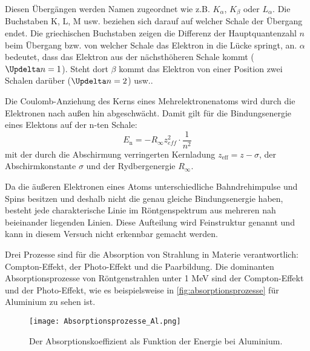 \documentclass[titlepage = firstcover]{scrartcl}
\begin{document}
        Diesen Übergängen werden Namen zugeordnet wie z.B. $K_\alpha$, $K_\beta$ oder $L_\alpha$. Die Buchstaben K, L, M usw. beziehen sich darauf auf welcher Schale der Übergang endet. Die griechischen Buchstaben zeigen die Differenz der Hauptquantenzahl $n$ beim Übergang bzw. von welcher Schale das Elektron in die Lücke springt, an. $\alpha$ bedeutet, dass das Elektron aus der nächsthöheren Schale kommt ($\Updelta n = 1$). Steht dort $\beta$ kommt das Elektron von einer Position zwei Schalen darüber ($\Updelta n = 2$) usw..

        Die Coulomb-Anziehung des Kerns eines Mehrelektronenatoms wird durch die Elektronen nach außen hin abgeschwächt. Damit gilt für die Bindungsenergie eines Elektons auf der n-ten Schale:
        \begin{equation}
            E_\text{n} = -R_{\infty} z^2_{eff} \cdot \frac{1}{n^2}
        \end{equation}
        mit der durch die Abschirmung verringerten Kernladung $z_\text{eff} = z - \sigma$, der Abschirmkonstante $\sigma$ und der Rydbergenergie $R_{\infty}$.

        Da die äußeren Elektronen eines Atoms unterschiedliche Bahndrehimpulse und Spins besitzen und deshalb nicht die genau gleiche Bindungsenergie haben, besteht jede charakterische Linie im Röntgenspektrum aus mehreren nah beieinander liegenden Linien. Diese Aufteilung wird Feinstruktur genannt und kann in diesem Versuch nicht erkennbar gemacht werden.

        Drei Prozesse sind für die Absorption von Strahlung in Materie verantwortlich: Compton-Effekt, der Photo-Effekt und die Paarbildung.
        Die dominanten Absorptionsprozesse von Röntgenstrahlen unter 1 MeV sind der Compton-Effekt und der Photo-Effekt, wie es beispielsweise in \autoref{fig:absorptionsprozesse} für Aluminium zu sehen ist.
        \begin{figure}[h]
          \centering
          \texttt{[image: Absorptionsprozesse\_Al.png]}
          \caption{Der Absorptionskoeffizient als Funktion der Energie bei Aluminium.}
          \label{fig:absorptionsprozesse}
        \end{figure}
        \FloatBarrier
\end{document}
